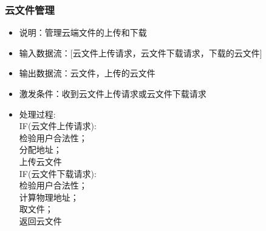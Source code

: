             \subsubsection{云文件管理}
            \begin{itemize}
                \item 说明：管理云端文件的上传和下载
                \item 输入数据流：[云文件上传请求，云文件下载请求，下载的云文件]
                \item 输出数据流：云文件，上传的云文件
                \item 激发条件：收到云文件上传请求或云文件下载请求
                \item 处理过程:  \\
                IF(云文件上传请求):\\
                    检验用户合法性；\\
                    分配地址；\\
                    上传云文件\\
                IF(云文件下载请求):\\
                    检验用户合法性；\\
                    计算物理地址；\\
                    取文件；\\
                    返回云文件\\
            \end{itemize}
